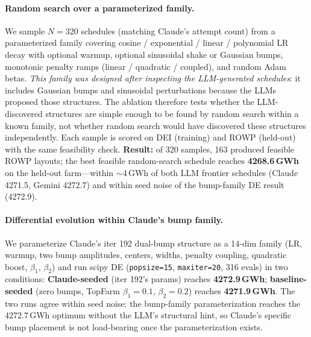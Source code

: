 \paragraph{Random search over a parameterized family.}
We sample $N=320$ schedules (matching Claude's attempt count) from
a parameterized family covering cosine / exponential / linear /
polynomial LR decay with optional warmup, optional sinusoidal shake
or Gaussian bumps, monotonic penalty ramps (linear / quadratic /
coupled), and random Adam betas. \emph{This family was designed
after inspecting the LLM-generated schedules}: it includes Gaussian
bumps and sinusoidal perturbations because the LLMs proposed those
structures. The ablation therefore tests whether the
LLM-discovered structures are simple enough to be found by random
search within a known family, not whether random search would have
discovered these structures independently.
Each sample is scored on DEI
(training) and ROWP (held-out) with the same feasibility check.
\textbf{Result:} of 320 samples, 163 produced feasible ROWP layouts;
the best feasible random-search schedule reaches \textbf{4268.6\,GWh}
on the held-out farm---within $\sim$4\,GWh of both LLM frontier
schedules (Claude 4271.5, Gemini 4272.7) and within seed noise of
the bump-family DE result (4272.9).

\paragraph{Differential evolution within Claude's bump family.}
We parameterize Claude's iter 192 dual-bump structure as a
14-dim family (LR, warmup, two bump amplitudes, centers, widths,
penalty coupling, quadratic boost, $\beta_1$, $\beta_2$) and run
scipy DE (\texttt{popsize=15}, \texttt{maxiter=20}, 316 evals) in
two conditions: \textbf{Claude-seeded} (iter 192's params) reaches
\textbf{4272.9\,GWh}; \textbf{baseline-seeded} (zero bumps,
TopFarm $\beta_1=0.1$, $\beta_2=0.2$) reaches \textbf{4271.9\,GWh}.
The two runs agree within seed noise: the bump-family
parameterization reaches the 4272.7\,GWh optimum without the LLM's
structural hint, so Claude's specific bump placement is not
load-bearing once the parameterization exists.

